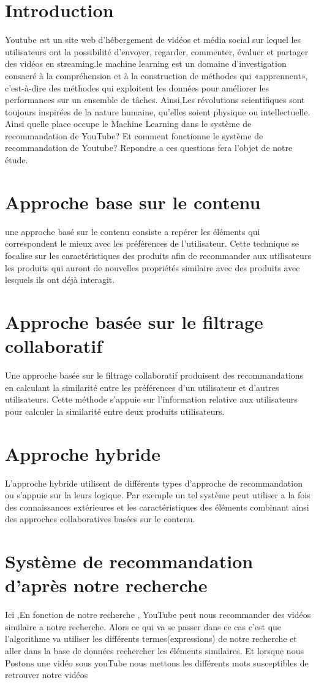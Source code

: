 \documentclass[12pt,a4paper]{article}
\begin{document}
\section*{Introduction}
  Youtube  est un site web d'hébergement de vidéos et média social sur lequel les utilisateurs ont la possibilité d'envoyer, regarder, 
commenter, évaluer et partager des vidéos en streaming.le machine learning est un domaine d'investigation consacré à la compréhension et 
à la construction de méthodes qui
 «apprennent», c'est-à-dire des méthodes qui exploitent les données pour améliorer les performances sur un ensemble de tâches. Ainsi,Les 
révolutions scientifiques sont toujours inspirées de la nature humaine, qu'elles soient physique ou intellectuelle. Ainsi 
quelle place occupe le Machine Learning dans le système de recommandation de YouTube? Et comment fonctionne le système de recommandation
 de Youtube? Repondre a ces questions fera l'objet de notre étude. 
\section{Approche base sur le contenu}	
 une approche basé sur le contenu consiste a repérer les éléments qui correspondent le mieux avec les préférences de l'utilisateur. Cette technique se focalise sur les caractéristiques des produits afin de recommander aux utilisateurs les produits qui auront de nouvelles propriétés 
similaire avec des produits avec lesquels ils ont déjà interagit. 
\section{Approche basée sur le filtrage collaboratif }	
Une approche basée sur le filtrage collaboratif produisent des recommandations en calculant la similarité entre les préférences d'un utilisateur et d'autres utilisateurs. Cette méthode s'appuie sur l'information relative aux utilisateurs pour calculer la similarité entre deux produits utilisateurs.
\section{Approche hybride}
L'approche hybride utilisent de différents types d'approche de recommandation ou s'appuie sur la leurs logique. Par exemple un tel système peut utiliser a la fois des connaissances extérieures et les caractéristiques des éléments combinant ainsi des approches collaboratives basées sur le contenu.	
\section{Système de recommandation d'après notre recherche}
Ici ,En fonction de notre recherche , YouTube peut nous recommander des vidéos similaire a notre
recherche. Alors ce qui va se passer dans ce cas c'est que l'algorithme va utiliser les différents termes(expressions) de notre recherche et aller
dans la base de données rechercher les éléments similaires. Et lorsque nous Postons une vidéo sous youTube nous mettons les différents mots 
susceptibles de retrouver notre vidéos 
\end{document}
